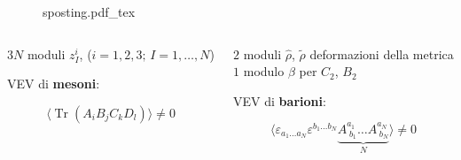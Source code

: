 \documentclass[aspectratio=43,mathserif]{beamer}
\newcommand{\tr}{\operatorname{Tr}}
\newcommand{\hatt}[1]{\ensuremath{\widehat{#1}}}
\newcommand{\tildd}[1]{\ensuremath{\widetilde{#1}}}
\begin{document}
\begin{frame}

	\vspace{-12pt}

	\begin{figure}[h!]\centering
	\def\svgscale{0.6}
	{sposting.pdf_tex}
	\end{figure}

	\vspace{-20pt}

	\begin{columns}
		\begin{column}{0.48\textwidth}
			\begin{center}	
				$3N$ moduli {\Large $z_I^i$}, (${\scriptstyle i=1,2,3; \,I = 1,\ldots,N}$)
			\end{center}

			\vfill {\centering VEV di \textbf{mesoni}:\par}
	
	\begin{equation}
		\langle\tr \left( A_i B_j C_k D_l \right)\rangle \neq 0
		\label{}
	\end{equation}

		\end{column}
		\begin{column}{0.52\textwidth}

			\vspace{-13pt}
			$2$ moduli $\hatt\rho$, $\tildd\rho$ deformazioni della metrica\\
			
			\vspace{10pt} $1$ modulo $\beta$ per $C_2$, $B_2$


			\vspace{10pt}VEV di \textbf{barioni}:

			\vspace{-13pt}
	\begin{equation}
	\langle	\varepsilon_{a_1 \ldots a_N} \varepsilon^{b_1 \ldots b_N} \underbrace{A^{a_1}_{\;b_1}  \ldots A^{a_N}_{\;b_N} }_{N}\rangle \neq 0
	\end{equation}



		\end{column}\end{columns}



\end{frame}
\end{document}
